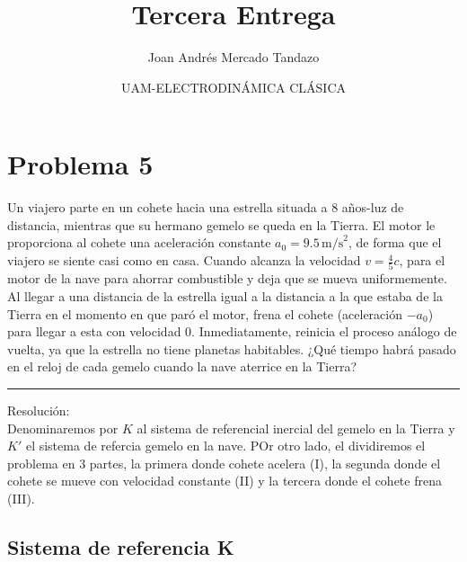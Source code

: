 \documentclass[11pt]{article}
\author{\Large Joan Andrés Mercado Tandazo}
\date{\Large UAM-ELECTRODINÁMICA CLÁSICA}
\title{\huge \textbf{Tercera Entrega}}
\begin{document}
\maketitle
\brightmode
\section{Problema 5}
Un viajero parte en un cohete hacia una estrella situada a 8 años-luz
de distancia, mientras que su hermano gemelo se queda en la Tierra.
El motor le proporciona al cohete una aceleración constante $a_0 = 9.5 \, \text{m/s}^2$, de forma que el viajero se siente casi como en casa. Cuando alcanza
la velocidad $v = \frac{4}{5} c$, para el motor de la nave para ahorrar combustible
y deja que se mueva uniformemente. Al llegar a una distancia de la
estrella igual a la distancia a la que estaba de la Tierra en el momento
en que paró el motor, frena el cohete (aceleración $-a_0$) para llegar a
esta con velocidad 0. Inmediatamente, reinicia el proceso análogo de
vuelta, ya que la estrella no tiene planetas habitables. ¿Qué tiempo
habrá pasado en el reloj de cada gemelo cuando la nave aterrice en la
Tierra?
\vspace*{1em}
\hrule
\vspace*{1em}
{\color{blue} Resolución:}\\
Denominaremos por $K$ al sistema de referencial inercial del gemelo en la Tierra y $K'$ el sistema de refercia gemelo en la nave. POr otro lado, el dividiremos el problema en 3 partes, la primera donde cohete acelera (I), la segunda donde el cohete se mueve con velocidad constante (II) y la tercera donde el cohete frena (III).\par

\subsection{Sistema de referencia K}
\end{document}

